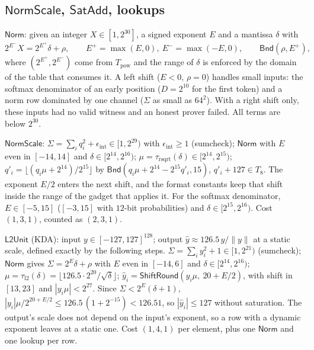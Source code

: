 \documentclass[11pt]{article}
\newcommand{\Bnd}{\mathsf{Bnd}}
\begin{document}
\subsection{\texorpdfstring{\(\mathsf{NormScale}\)}{NormScale}, \texorpdfstring{\(\mathsf{SatAdd}\)}{SatAdd}, lookups}

\label{sec:g-norm}
\(\mathsf{Norm}\): given an integer \(X \in [1, 2^{30}]\), a signed exponent \(E\) and a mantissa \(\delta\) with
\[
2^{E^-} X = 2^{E^+} \delta + \rho, \qquad E^+ = \max(E, 0),\ E^- = \max(-E, 0),\qquad \Bnd(\rho, E^+),
\]
where \((2^{E^+}, 2^{E^-})\) come from \(T_{\mathrm{pow}}\) and the range of \(\delta\) is enforced by the domain of the table that consumes it.
A left shift (\(E < 0\), \(\rho = 0\)) handles small inputs: the softmax denominator of an early position (\(D = 2^{10}\) for the first token) and a norm row dominated by one channel (\(\Sigma\) as small as \(64^2\)).
With a right shift only, these inputs had no valid witness and an honest prover failed.
All terms are below \(2^{30}\).

\(\mathsf{NormScale}\): \(\Sigma = \sum_i q_i^2 + \epsilon_{\mathrm{int}} \in [1, 2^{29})\) with \(\epsilon_{\mathrm{int}} \ge 1\) (sumcheck); \(\mathsf{Norm}\) with \(E\) even in \([-14, 14]\) and \(\delta \in [2^{14}, 2^{16})\); \(\mu = \tau_{\mathrm{rsqrt}}(\delta) \in [2^{14}, 2^{15})\); \(q'_i = \lfloor (q_i\mu + 2^{14})/2^{15}\rfloor\) by \(\Bnd(q_i \mu + 2^{14} - 2^{15} q'_i, 15)\), \(q'_i + 127 \in T_8\).
The exponent \(E/2\) enters the next shift, and the format constants keep that shift inside the range of the gadget that applies it.
For the softmax denominator, \(E \in [-5, 15]\) (\([-3, 15]\) with \(12\)-bit probabilities) and \(\delta \in [2^{15}, 2^{16})\).
Cost \((1, 3, 1)\), counted as \((2,3,1)\).

\label{sec:g-l2}
\(\mathsf{L2Unit}\) (KDA): input \(y \in [-127,127]^{128}\); output \(\hat y \approx 126.5\, y/\|y\|\) at a static scale, defined exactly by the following steps.
\(\Sigma = \sum_i y_i^2 + 1 \in [1, 2^{21})\) (sumcheck); \(\mathsf{Norm}\) gives \(\Sigma = 2^E \delta + \rho\) with \(E\) even in \([-14, 6]\) and \(\delta \in [2^{14}, 2^{16})\); \(\mu = \tau_{\mathrm{l2}}(\delta) = \lfloor 126.5\cdot 2^{20}/\sqrt{\delta}\rfloor\); \(\hat y_i = \mathsf{ShiftRound}(y_i \mu,\ 20 + E/2)\), with shift in \([13, 23]\) and \(|y_i\mu| < 2^{27}\).
Since \(\Sigma < 2^E(\delta + 1)\), \(|y_i|\mu / 2^{20 + E/2} \le 126.5\,(1 + 2^{-15}) < 126.51\), so \(|\hat y_i| \le 127\) without saturation.
The output's scale does not depend on the input's exponent, so a row with a dynamic exponent leaves at a static one.
Cost \((1, 4, 1)\) per element, plus one \(\mathsf{Norm}\) and one lookup per row.
\end{document}
